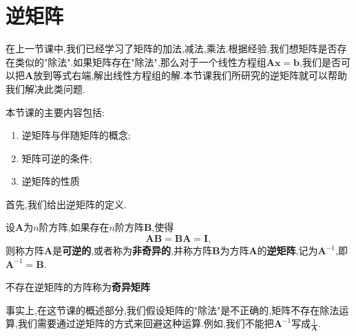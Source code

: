 \chapter{逆矩阵}\label{ch:2}

在上一节课中,我们已经学习了矩阵的加法,减法,乘法.根据经验,我们想矩阵是否存在类似的"除法".如果矩阵存在"除法",那么对于一个线性方程组$\mathbf{A}\mathbf{x}=\mathbf{b}$,我们是否可以把$\mathbf{A}$放到等式右端,解出线性方程组的解.本节课我们所研究的逆矩阵就可以帮助我们解决此类问题.

本节课的主要内容包括:
\begin{enumerate}
	\item 逆矩阵与伴随矩阵的概念;
	\item 矩阵可逆的条件;
	\item 逆矩阵的性质
\end{enumerate}

首先,我们给出逆矩阵的定义.
\begin{definition}
	设$\mathbf{A}$为$n$阶方阵,如果存在$n$阶方阵$\mathbf{B}$,使得
	\[
		\mathbf{AB}=\mathbf{BA}=\mathbf{I},
	\]
	则称方阵$\mathbf{A}$是\textbf{可逆的},或者称为\textbf{非奇异的},并称方阵$\mathbf{B}$为方阵$\mathbf{A}$的\textbf{逆矩阵},记为$\mathbf{A}^{-1}$,即$\mathbf{A}^{-1}=\mathbf{B}$.

	不存在逆矩阵的方阵称为\textbf{奇异矩阵}
\end{definition}

事实上,在这节课的概述部分,我们假设矩阵的"除法"是不正确的,矩阵不存在除法运算,我们需要通过逆矩阵的方式来回避这种运算.例如,我们不能把$\mathbf{A}^{-1}$写成$\frac{1}{\mathbf{A}}$.

